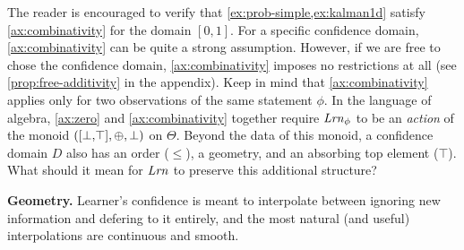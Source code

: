The reader is encouraged
 to verify that \cref{ex:prob-simple,ex:kalman1d} satisfy \cref{ax:combinativity} for the domain $[0,1]$.
For a specific confidence domain, 
\cref{ax:combinativity} can be quite a strong assumption. 
However, if we are free to chose the confidence domain, \cref{ax:combinativity} imposes no restrictions at all (see \cref{prop:free-additivity} in the appendix).
{\color{gray}%
Keep in mind that \cref{ax:combinativity} applies only for two
observations of the same statement $\phi$.
}%
In the language of algebra, \cref{ax:zero} and \ref{ax:combinativity} together require $\mathit{Lrn}_\phi$ to be an \emph{action} of the monoid $([\bot,\!\top], \oplus, \bot)$ on $\Theta$.
Beyond the data of this monoid, a confidence domain $D$ also has 
	an order ($\le$),
	a geometry,
	and an absorbing top element ($\top$). 
What should it mean for $\mathit{Lrn}$ to preserve this additional structure? 



\textbf{Geometry.}
Learner's confidence is meant to interpolate between 
	ignoring new information and defering to it entirely,
	and the most natural (and useful) interpolations are continuous and smooth.
	
